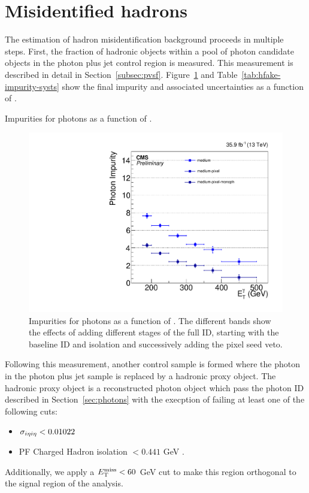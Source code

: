 \section{Misidentified hadrons}
\label{sec:hfake}

The estimation of hadron misidentification background proceeds in multiple steps. 
First, the fraction of hadronic objects within a pool of photon candidate objects in the photon plus jet control region is measured. 
This measurement is described in detail in Section~\ref{subsec:pvsf}.
Figure~\ref{fig:impurity-compsb} and Table~\ref{tab:hfake-impurity-systs} show the final impurity and associated uncertainties as a function of \pt. 

\begin{table}[htbp]
  \centering
  
  \caption{Impurities for photons as a function of \pt.}
  \label{tab:hfake-impurity-systs}
\end{table}

\begin{figure}[htbp]
  \centering
  \includegraphics[width=0.45\linewidth]{Analysis/Figures/hfake/plot_impurity_barrel_medium.pdf}
    \caption{
    Impurities for photons as a function of \pt. 
    The different bands show the effects of adding different stages of the full ID, starting with the baseline ID and isolation and successively adding the pixel seed veto.
  }
  \label{fig:impurity-compsb}
\end{figure}

Following this measurement, another control sample is formed where the photon in the photon plus jet sample is replaced by a hadronic proxy object. 
The hadronic proxy object is a reconstructed photon object which pass the photon ID described in Section~\ref{sec:photons} with the execption of failing at least one of the following cuts: 
\begin{itemize}
\item $\sigma_{i\eta i\eta} < 0.01022$
\item PF Charged Hadron isolation $< 0.441$ GeV .
\end{itemize}
Additionally, we apply a $E_{\mathrm{T}}^{\text{miss}} < 60$ GeV cut to make this region orthogonal to the signal region of the analysis.
  
